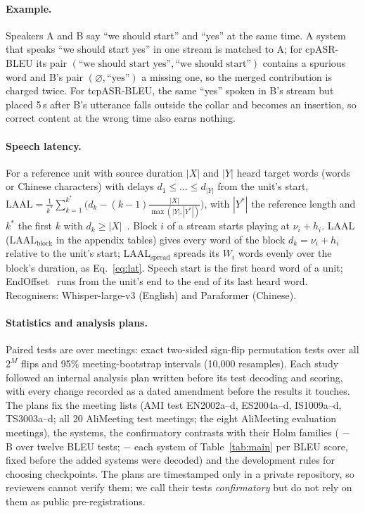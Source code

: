 \paragraph{Example.} Speakers A and B say ``we should start'' and ``yes'' at the same time. A system that speaks
``we should start yes'' in one stream is matched to A; for cpASR-BLEU its pair $(\text{``we should start yes''},
\text{``we should start''})$ contains a spurious word and B's pair $(\varnothing,\text{``yes''})$ a missing one, so the
merged contribution is charged twice. For tcpASR-BLEU, the same ``yes'' spoken in B's stream but placed 5\,s after B's
utterance falls outside the collar and becomes an insertion, so correct content at the wrong time also earns nothing.

\paragraph{Speech latency.} For a reference unit with source duration $|X|$ and $|Y|$ heard target words (words or
Chinese characters) with delays $d_1\le\dots\le d_{|Y|}$ from the unit's start,
$\mathrm{LAAL}=\frac{1}{k^\ast}\sum_{k=1}^{k^\ast}\big(d_k-(k-1)\frac{|X|}{\max(|Y|,|Y^\ast|)}\big)$, with $|Y^\ast|$ the
reference length and $k^\ast$ the first $k$ with $d_k\ge|X|$~\citep{papi2022over}. Block $i$ of a stream starts
playing at $\nu_i+h_i$. LAAL (LAAL$_\text{block}$ in the appendix tables) gives every word of the block
$d_k=\nu_i+h_i$ relative to the unit's start; LAAL$_\text{spread}$ spreads its $W_i$ words evenly over the block's
duration, as Eq.~\eqref{eq:lat}. Speech start is the first heard word of a unit; EndOffset~\citep{ma2020simuleval} runs
from the unit's end to the end of its last heard word. Recognisers: Whisper-large-v3 (English) and Paraformer
(Chinese).

\paragraph{Statistics and analysis plans.} Paired tests are over meetings: exact two-sided sign-flip permutation tests
over all $2^M$ flips and 95\% meeting-bootstrap intervals (10{,}000 resamples). Each study followed an internal analysis
plan written before its test decoding and scoring, with every change recorded as a dated amendment before the results
it touches. The plans fix the meeting lists (AMI test EN2002a--d, ES2004a--d, IS1009a--d, TS3003a--d; all 20 AliMeeting
test meetings; the eight AliMeeting evaluation meetings), the systems, the confirmatory contrasts with their Holm
families (\sys{} $-$ B over twelve BLEU tests; \sys{} $-$ each system of Table~\ref{tab:main} per BLEU score, fixed
before the added systems were decoded) and the development rules for choosing checkpoints. The plans are timestamped
only in a private repository, so reviewers cannot verify them; we call their tests \emph{confirmatory} but do not rely
on them as public pre-registrations.

